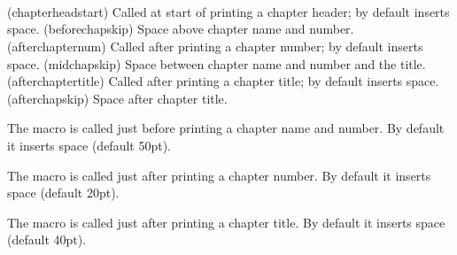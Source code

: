 \begin{syntax}
\cmd{\chapterheadstart} \lnc{\beforechapskip} \\
\cmd{\afterchapternum} \lnc{\midchapskip} \\
\cmd{\afterchaptertitle} \lnc{\afterchapskip} \\
\end{syntax}
\glossary(chapterheadstart)%
  {}%
  {Called at start of printing a chapter header; by default inserts  space.}
\glossary(beforechapskip)%
  {}%
  {Space above chapter name and number.}
\glossary(afterchapternum)%
  {}%
  {Called after printing a chapter number; by default inserts  space.}
\glossary(midchapskip)%
  {}%
  {Space between chapter name and number and the title.}
\glossary(afterchaptertitle)%
  {}%
  {Called after printing a chapter title; by default inserts  space.}
\glossary(afterchapskip)%
  {}%
  {Space after chapter title.}

The macro \cmd{\chapterheadstart} is called just before printing a chapter
name and number. By default it inserts \lnc{\beforechapskip} space (default
50pt).

The macro \cmd{\afterchapternum} is called just after printing a chapter
number. By default it inserts \lnc{\midchapskip} space (default
20pt).

The macro \cmd{\afterchaptertitle} is called just after printing a chapter
title. By default it inserts \lnc{\afterchapskip} space (default
40pt).


